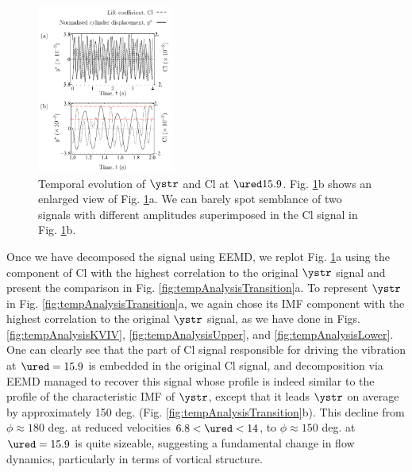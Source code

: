 \documentclass[a4paper,fleqn]{cas-sc}
\begin{document}
\begin{figure}
  \centering
  \includegraphics[width=0.4\textwidth]{figs/figure15}
  \caption{Temporal evolution of $\ystr$ and Cl at $\ured 15.9$. Fig. \ref{fig:tempEvoCompare}b shows an enlarged view of Fig. \ref{fig:tempEvoCompare}a. We can barely spot semblance of two signals with different amplitudes superimposed in the Cl signal in Fig. \ref{fig:tempEvoCompare}b.} \label{fig:tempEvoCompare}
\end{figure}

Once we have decomposed the signal using EEMD, we replot Fig. \ref{fig:tempEvoCompare}a using the component of Cl with the highest correlation to the original  $\ystr$ signal and present the comparison in Fig. \ref{fig:tempAnalysisTransition}a. To represent  $\ystr$ in Fig. \ref{fig:tempAnalysisTransition}a, we again chose its IMF component with the highest correlation to the original  $\ystr$ signal, as we have done in Figs. \ref{fig:tempAnalysisKVIV}, \ref{fig:tempAnalysisUpper}, and \ref{fig:tempAnalysisLower}. One can clearly see that the part of Cl signal responsible for driving the vibration at  $\ured = 15.9$ is embedded in the original Cl signal, and decomposition via EEMD managed to recover this signal whose profile is indeed similar to the profile of the characteristic IMF of $\ystr$, except that it leads $\ystr$ on average by approximately 150 deg. (Fig. \ref{fig:tempAnalysisTransition}b). This decline from $\phi \approx 180$ deg. at reduced velocities $6.8 < \ured < 14$, to $\phi \approx 150$ deg. at $\ured = 15.9$ is quite sizeable, suggesting a fundamental change in flow dynamics, particularly in terms of vortical structure.
\end{document}
